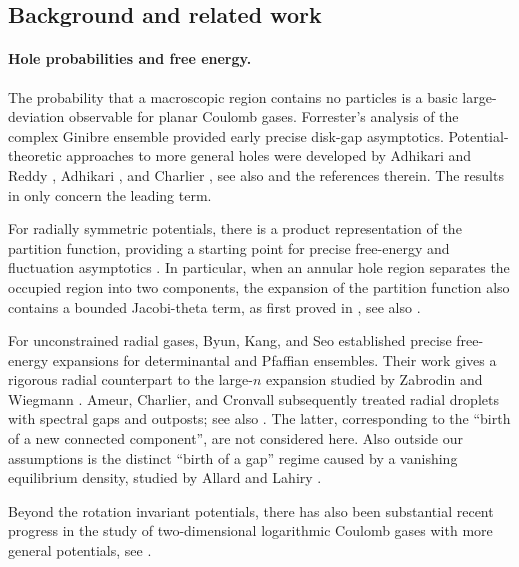\documentclass[a4paper]{article}
\numberwithin{equation}{section}
\begin{document}
\subsection{Background and related work}
\label{subsection:background}

\paragraph{Hole probabilities and free energy.}
The probability that a macroscopic region contains no particles is a basic
large-deviation observable for planar Coulomb gases.  Forrester's analysis
of the complex Ginibre ensemble \cite{ForresterHoleProba} provided early
precise disk-gap asymptotics.  Potential-theoretic approaches to more general
holes were developed by Adhikari and Reddy \cite{AR2017}, Adhikari
\cite{A2018}, and Charlier \cite{C2023}, see also \cite{ASZ2014,BLY2026,BF25} and the references therein. The results in \cite{AR2017, A2018, C2023} only concern the leading term.

For radially symmetric potentials, there is a product representation of the partition function, providing a starting point for precise free-energy and fluctuation asymptotics \cite{C2021 FH,C2021, BKS2023,ACC2023c}. In particular, when an annular hole region separates the occupied region into two components, the expansion of the partition function also contains a bounded Jacobi-theta term, as first proved in \cite{C2021}, see also \cite{ACCL2, ACC2023c}.

For unconstrained radial gases, Byun, Kang, and
Seo \cite{BKS2023} established precise free-energy expansions for
determinantal and Pfaffian ensembles.  Their work gives a rigorous radial
counterpart to the large-$n$ expansion studied by Zabrodin and Wiegmann
\cite{ZW2006}.  Ameur, Charlier, and Cronvall \cite{ACC2023c} subsequently
treated radial droplets with spectral gaps and outposts; see also
\cite{ACCL2,Noda2026}. The latter, corresponding to the ``birth of a new
connected component'', are not considered here. Also outside our assumptions
is the distinct ``birth of a gap'' regime caused by a vanishing equilibrium
density, studied by Allard and Lahiry \cite{AL25}.

Beyond the rotation invariant potentials, there has also been substantial recent progress in the study of two-dimensional logarithmic Coulomb gases with more general potentials, see \cite{R2025,Ser2024,Ser2023,AS2021,LS2017,B2025,BCMS2025,BSY2025,BYY2026,BFKL25,BFL25,HW2021,HW2024,HWpreprint,Jo2022,JV2023}.
\end{document}
